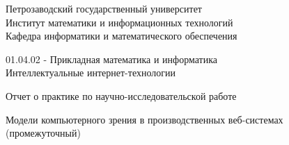 \thispagestyle{empty}
\begin{center}


\renewcommand{\baselinestretch}{1}
{\large
{\sc Петрозаводский государственный университет\\
Институт математики и информационных технологий\\
	Кафедра информатики и математического обеспечения
}
}

\end{center}


\begin{center}

 01.04.02 - Прикладная математика и информатика \\
	Интеллектуальные интернет-технологии
\end{center}

\vfill

\begin{center}
{\normalsize Отчет о практике по научно-исследовательской работе} \\
\medskip

	Модели компьютерного зрения в производственных веб-системах \\
	(промежуточный)
\end{center}

\medskip

